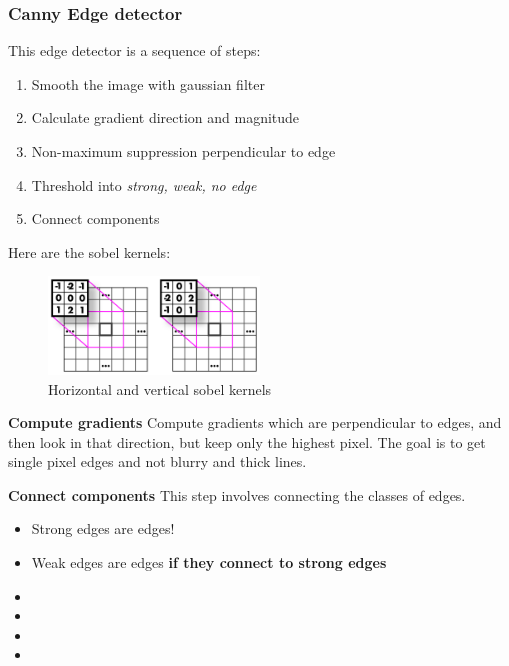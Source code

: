 \documentclass[a4paper]{article}
\begin{document}
\subsubsection*{Canny Edge detector}
This edge detector is a sequence of steps:
\begin{enumerate}
	\item Smooth the image with gaussian filter
	\item Calculate gradient direction and magnitude
	\item Non-maximum suppression perpendicular to edge
	\item Threshold into \textit{strong, weak, no edge} 
	\item Connect components
\end{enumerate}


Here are the sobel kernels:
\begin{figure}[H]
\centering
\includegraphics[width=0.5\textwidth]{figures/sobel_kernels.png}
\caption{Horizontal and vertical sobel kernels}
\label{fig:sobel_kernel}
\end{figure} 

\textbf{Compute gradients} 
Compute gradients which are perpendicular to edges, and then look in that direction, but keep only the highest pixel. The goal is to get single pixel edges and not blurry and thick lines.



\textbf{Connect components} 
This step involves connecting the classes of edges. 
\begin{itemize}
	\item Strong edges are edges!
	\item Weak edges are edges \textbf{if they connect to strong edges }
	\item 
	\item
	\item
	\item
\end{itemize}





\newpage
\centering
\end{document}
